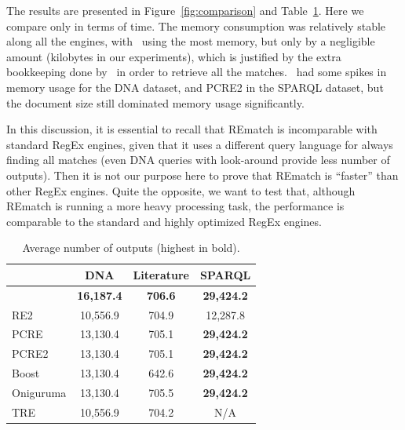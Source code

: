 The results are presented in Figure~\ref{fig:comparison} and
Table~\ref{tab:outputs}. Here we compare only in terms of time. The memory
consumption was relatively stable along all the engines, with \rematch\ using
the most memory, but only by a negligible amount (kilobytes in our experiments),
which is justified by the extra bookkeeping done by \rematch\ in order to
retrieve all the matches.  \rematch\ had some spikes in memory usage for the
\textsf{DNA} dataset, and \textsf{PCRE2} in the \textsf{SPARQL} dataset, but the
document size still dominated memory usage significantly.

In this discussion, it is essential to recall that REmatch is incomparable with
standard RegEx engines, given that it uses a different query language for always
finding all matches (even DNA queries with look-around provide less number of
outputs). Then it is not our purpose here to prove that REmatch is ``faster''
than other RegEx engines. Quite the opposite, we want to test that, although
REmatch is running a more heavy processing task, the performance is comparable
to the standard and highly optimized RegEx engines.

\begin{table}
	\begin{tabular}{l|ccc}
		                   & \textsf{DNA}      & \textsf{Literature} &
		                   \textsf{SPARQL}   \\
		\hline
		\rematch           & \textbf{16,187.4} & \textbf{706.6}      &
		\textbf{29,424.2} \\
		\textsf{RE2}       & 10,556.9          & 704.9               & 12,287.8
		\\
		\textsf{PCRE}      & 13,130.4          & 705.1               &
		\textbf{29,424.2} \\
		\textsf{PCRE2}     & 13,130.4          & 705.1               &
		\textbf{29,424.2} \\
		\textsf{Boost}     & 13,130.4          & 642.6               &
		\textbf{29,424.2} \\
		\textsf{Oniguruma} & 13,130.4          & 705.5               &
		\textbf{29,424.2} \\
		\textsf{TRE}       & 10,556.9          & 704.2               & N/A
	\end{tabular}
	\caption{Average number of outputs (highest in bold).}
	\label{tab:outputs}
\end{table}

